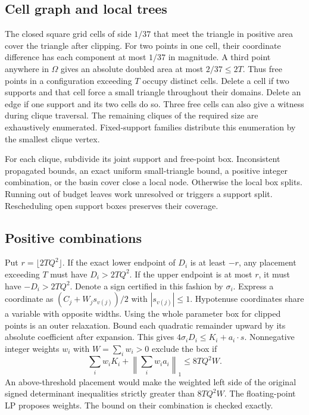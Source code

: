 \documentclass[11pt]{amsart}
\newcommand{\Om}{\Omega}
\begin{document}
\subsection{Cell graph and local trees}
The closed square grid cells of side \(1/37\) that meet the triangle in positive area cover the triangle after clipping. For two points in one cell, their coordinate difference has each component at most \(1/37\) in magnitude. A third point anywhere in \(\Om\) gives an absolute doubled area at most \(2/37\le2T\). Thus free points in a configuration exceeding \(T\) occupy distinct cells. Delete a cell if two supports and that cell force a small triangle throughout their domains. Delete an edge if one support and its two cells do so. Three free cells can also give a witness during clique traversal. The remaining cliques of the required size are exhaustively enumerated. Fixed-support families distribute this enumeration by the smallest clique vertex.

For each clique, subdivide its joint support and free-point box. Inconsistent propagated bounds, an exact uniform small-triangle bound, a positive integer combination, or the basin cover close a local node. Otherwise the local box splits. Running out of budget leaves work unresolved or triggers a support split. Rescheduling open support boxes preserves their coverage.

\subsection{Positive combinations}
Put \(r=\lfloor 2TQ^2\rfloor\). If the exact lower endpoint of \(D_i\) is at least \(-r\), any placement exceeding \(T\) must have \(D_i>2TQ^2\). If the upper endpoint is at most \(r\), it must have \(-D_i>2TQ^2\). Denote a sign certified in this fashion by \(\sigma_i\).
Express a coordinate as \((C_j+W_js_{v(j)})/2\) with \(|s_{v(j)}|\le1\). Hypotenuse coordinates share a variable with opposite widths. Using the whole parameter box for clipped points is an outer relaxation. Bound each quadratic remainder upward by its absolute coefficient after expansion. This gives \(4\sigma_i D_i\le K_i+a_i\cdot s\). Nonnegative integer weights \(w_i\) with \(W=\sum_i w_i>0\) exclude the box if
\[
\sum_i w_iK_i+\left\|\sum_i w_i a_i\right\|_1\le 8TQ^2 W.
\]
An above-threshold placement would make the weighted left side of the original signed determinant inequalities strictly greater than \(8TQ^2W\). The floating-point LP proposes weights. The bound on their combination is checked exactly.
\end{document}

